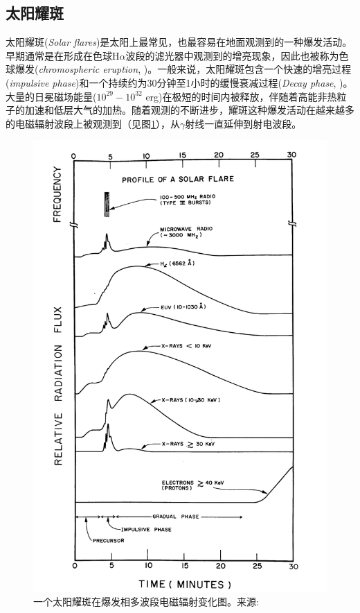 \subsection{太阳耀斑}
太阳耀斑(\textit{Solar flares})是太阳上最常见，也最容易在地面观测到的一种爆发活动。早期通常是在形成在色球H$\alpha$波段的滤光器中观测到的增亮现象，因此也被称为色球爆发(\textit{chromospheric eruption}, \cites{Lin2000})。一般来说，太阳耀斑包含一个快速的增亮过程(\textit{impulsive phase})和一个持续约为30分钟至1小时的缓慢衰减过程(\textit{Decay phase}, \cite{Stix2004})。大量的日冕磁场能量($10^{29}-10^{32}$ erg)在极短的时间内被释放，伴随着高能非热粒子的加速和低层大气的加热。随着观测的不断进步，耀斑这种爆发活动在越来越多的电磁辐射波段上被观测到（见图\ref{fig:1}），从$\gamma$射线一直延伸到射电波段\parencite{Dulk1985,Masuda1994,Thompson1995}。
\begin{figure}
	\centering
	\includegraphics[width=0.4\linewidth]{figs/fig1}
	\caption{一个太阳耀斑在爆发相多波段电磁辐射变化图。来源: \textcite{Kane1974}}
	\label{fig:1}
\end{figure}



